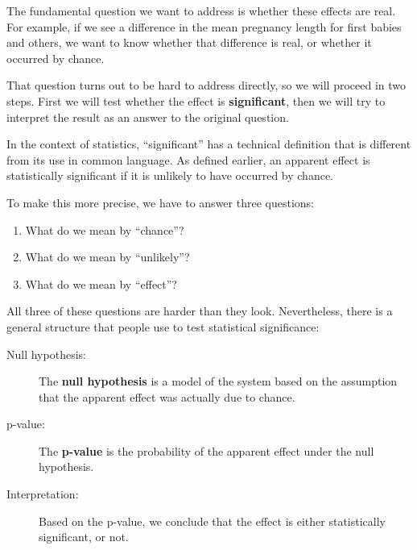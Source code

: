 \documentclass[12pt]{book}
\begin{document}
The fundamental question we want to address is whether these effects
are real.  For example, if we see a difference in the mean pregnancy
length for first babies and others, we want to know whether that
difference is real, or whether it occurred by chance.

That question turns out to be hard to address directly, so we will
proceed in two steps.  First we will test whether the effect is {\bf
  significant}, then we will try to interpret the result
  as an answer to the original question.

In the context of statistics, ``significant'' has a technical
definition that is different from its use in common language.
As defined earlier, an apparent effect is statistically
significant if it is unlikely to have occurred by chance.

To make this more precise, we have to answer three questions:

\begin{enumerate}

\item What do we mean by ``chance''?

\item What do we mean by ``unlikely''?

\item What do we mean by ``effect''?

\end{enumerate}

All three of these questions are harder than they look.  Nevertheless,
there is a general structure that people use to test statistical
significance:

\begin{description}

\item[Null hypothesis:] The {\bf null hypothesis} is a model of the
  system based on the assumption that the apparent effect was actually
  due to chance.

\item[p-value:] The {\bf p-value} is the probability of the apparent
  effect under the null hypothesis.

\item[Interpretation:] Based on the p-value, we conclude that the
  effect is either statistically significant, or not.

\end{description}
\end{document}
